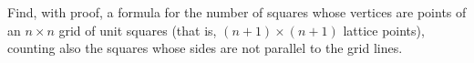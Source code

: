 Find, with proof, a formula for the number of squares whose vertices are points of an \(n\times n\) grid of unit squares (that is, \((n+1)\times(n+1)\) lattice points), counting also the squares whose sides are not parallel to the grid lines.
